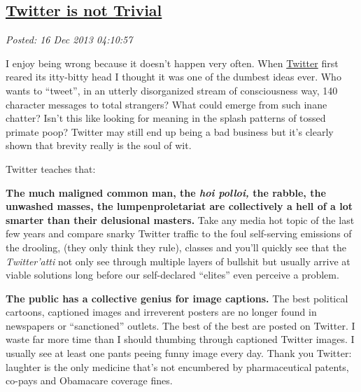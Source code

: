 %

\subsection*{\href{https://bakerjd99.wordpress.com/2013/12/15/twitter-is-not-trivial/}{Twitter is not Trivial}}


\noindent\emph{Posted: 16 Dec 2013 04:10:57}
\vspace{6pt}

I enjoy being wrong because it doesn't happen very often. When
\href{https://twitter.com/}{Twitter} first reared its itty-bitty head I
thought it was one of the dumbest ideas ever. Who wants to ``tweet'', in
an utterly disorganized stream of consciousness way, 140 character
messages to total strangers? What could emerge from such inane chatter?
Isn't this like looking for meaning in the splash patterns of tossed
primate poop? Twitter may still end up being a bad business but it's
clearly shown that brevity really is the soul of wit.

\medskip 

Twitter teaches that:

\medskip

\textbf{The much maligned common man, the \emph{hoi polloi,} the rabble,
the unwashed masses, the lumpenproletariat are collectively a hell of a
lot smarter than their delusional masters.} Take any media hot topic of
the last few years and compare snarky Twitter traffic to the foul
self-serving emissions of the drooling, (they only think they rule),
classes and you'll quickly see that the \emph{Twitter'atti} not only see
through multiple layers of bullshit but usually arrive at viable
solutions long before our self-declared ``elites'' even perceive a
problem.

\textbf{The public has a collective genius for image captions.} The best
political cartoons, captioned images and irreverent posters are no
longer found in newspapers or ``sanctioned'' outlets. The best of the
best are posted on Twitter. I waste far more time than I should thumbing
through captioned Twitter images. I usually see at least one pants
peeing funny image every day. Thank you Twitter: laughter is the only
medicine that's not encumbered by pharmaceutical patents, co-pays and
Obamacare coverage fines.



